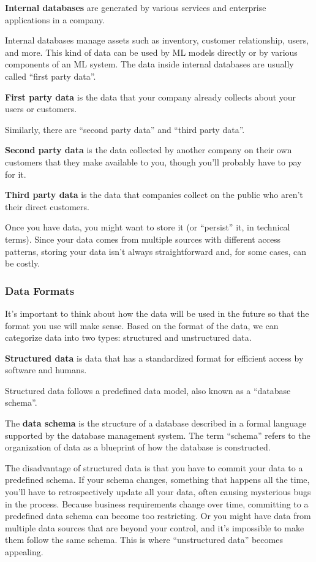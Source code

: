 \textbf{Internal databases} are generated by various services and enterprise applications in a company.
\ed

Internal databases manage assets such as inventory, customer relationship, users, and more. This kind of data can be
used by ML models directly or by various components of an ML system. The data inside internal databases are usually
called ``first party data''.

\textbf{First party data} is the data that your company already collects about your users or customers.
\ed

Similarly, there are ``second party data'' and ``third party data''.

\textbf{Second party data} is the data collected by another company on their own customers that they make available
to you, though you'll probably have to pay for it.
\ed

\textbf{Third party data} is the data that companies collect on the public who aren't their direct customers.
\ed

Once you have data, you might want to store it (or ``persist'' it, in technical terms). Since your data comes from
multiple sources with different access patterns, storing your data isn't always straightforward and, for some cases,
can be costly.

\subsubsection{Data Formats}

It's important to think about how the data will be used in the future so that the format you use will make sense.
Based on the format of the data, we can categorize data into two types: structured and unstructured data.

\textbf{Structured data} is data that has a standardized format for efficient access by software and humans.
\ed

Structured data follows a predefined data model, also known as a ``database schema''.

The \textbf{data schema} is the structure of a database described in a formal language supported by the database
management system. The term ``schema'' refers to the organization of data as a blueprint of how the database is
constructed.
\ed

The disadvantage of structured data is that you have to commit your data to a predefined schema. If your schema
changes, something that happens all the time, you'll have to retrospectively update all your data, often causing
mysterious bugs in the process. Because business requirements change over time, committing to a predefined data
schema can become too restricting. Or you might have data from multiple data sources that are beyond your control,
and it's impossible to make them follow the same schema. This is where ``unstructured data'' becomes appealing.

